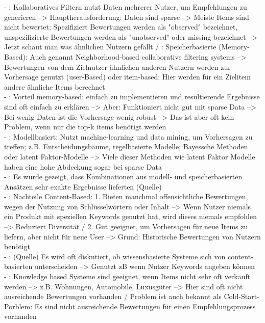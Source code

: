 - \cite[S. 8]{recommenderSystems:2016}: Kollaboratives Filtern nutzt Daten mehrerer Nutzer, um Empfehlungen zu generieren --> Hauptherausforderung: Daten sind sparse --> Meiste Items sind nicht bewertet; Spezifiziert Bewertungen werden als "observed" bezeichnet, unspezifizierte Bewertungen werden als "unobserved" oder missing bezeichnet --> Jetzt schaut man was ähnlichen Nutzern gefällt / \cite[S. 9]{recommenderSystems:2016}: Speicherbasierte (Memory-Based): Auch genannt Neighborhood-based collaborative filtering systems --> Bewertungen von dem Zielnutzer ähnlichen anderen Nutzern werden zur Vorhersage genutzt (user-Based) oder item-based: Hier werden für ein Zielitem andere ähnliche Items berechnet\\
- \cite[S. 9]{recommenderSystems:2016}: Vorteil memory-based: einfach zu implementieren und resultierende Ergebnisse sind oft einfach zu erklären --> Aber: Funktioniert nicht gut mit sparse Data --> Bei wenig Daten ist die Vorhersage wenig robust --> Das ist aber oft kein Problem, wenn nur die top-k items benötigt werden\\
- \cite[S. 9]{recommenderSystems:2016}: Modellbasiert: Nutzt machine-learning und data mining, um Vorhersagen zu treffen; z.B. Entscheidungsbäume, regelbasierte Modelle; Bayessche Methoden oder latent Faktor-Modelle --> Viele dieser Methoden wie latent Faktor Modelle haben eine hohe Abdeckung sogar bei sparse Data\\
- \cite[S. 10]{recommenderSystems:2016}: Es wurde gezeigt, dass Kombinationen aus modell- und speicherbasierten Ansätzen sehr exakte Ergebnisse lieferten (Quelle)\\
- \cite[S. 15]{recommenderSystems:2016}: Nachteile Content-Based: 1. Bieten manchmal offensichtliche Bewertungen, wegen der Nutzung von Schlüsselwörtern oder Inhalt --> Wenn Nutzer niemals ein Produkt mit speziellen Keywords genutzt hat, wird dieses niemals empfohlen --> Reduziert Diversität / 2. Gut geeignet, um Vorhersagen für neue Items zu liefern, aber nicht für neue User --> Grund: Historische Bewertungen von Nutzern benötigt \\
- \cite[S. 15]{recommenderSystems:2016}: (Quelle) Es wird oft diskutiert, ob wissensbasierte Systeme sich von content-basierten unterscheiden --> Genutzt zB wenn Nutzer Keywords angeben können\\
- \cite[S. 15]{recommenderSystems:2016}: Knowledge based Systeme sind geeignet, wenn Items nicht sehr oft verkauft werden --> z.B. Wohnungen, Automobile, Luxusgüter --> Hier sind oft nicht ausreichende Bewertungen vorhanden / Problem ist auch bekannt als Cold-Start-Porblem: Es sind nicht ausreichende Bewertungen für einen Empfehlungsprozess vorhanden \\
